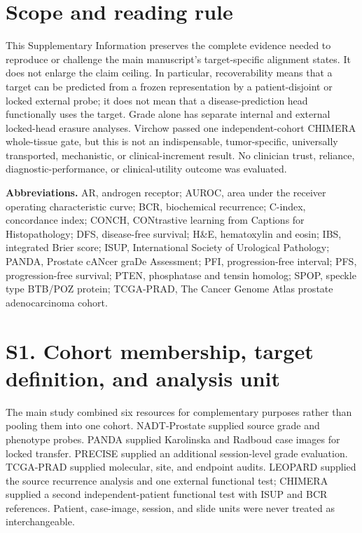 \section*{Scope and reading rule}

This Supplementary Information preserves the complete evidence needed to reproduce or
challenge the main manuscript's target-specific alignment states. It does not enlarge the
claim ceiling. In particular, recoverability means that a target can be predicted from a
frozen representation by a patient-disjoint or locked external probe; it does not mean that
a disease-prediction head functionally uses the target. Grade alone has separate internal and
external locked-head erasure analyses. Virchow passed one independent-cohort CHIMERA
whole-tissue gate, but this is not an indispensable, tumor-specific, universally transported,
mechanistic, or clinical-increment result. No clinician trust, reliance, diagnostic-performance, or
clinical-utility outcome was evaluated.

\noindent\textbf{Abbreviations.} AR, androgen receptor; AUROC, area under the receiver
operating characteristic curve; BCR, biochemical recurrence; C-index, concordance index;
CONCH, CONtrastive learning
from Captions for Histopathology; DFS, disease-free survival; H\&E, hematoxylin and eosin;
IBS, integrated Brier score; ISUP, International Society of Urological Pathology; PANDA,
Prostate cANcer graDe Assessment; PFI, progression-free interval; PFS, progression-free
survival; PTEN, phosphatase and tensin homolog; SPOP, speckle type BTB/POZ protein;
TCGA-PRAD, The Cancer Genome Atlas prostate adenocarcinoma cohort.

\section*{S1. Cohort membership, target definition, and analysis unit}

The main study combined six resources for complementary purposes rather than pooling them
into one cohort. NADT-Prostate supplied source grade and phenotype probes. PANDA supplied
Karolinska and Radboud case images for locked transfer. PRECISE supplied an additional
session-level grade evaluation. TCGA-PRAD supplied molecular, site, and endpoint audits.
LEOPARD supplied the source recurrence analysis and one external functional test; CHIMERA
supplied a second independent-patient functional test with ISUP and BCR references. Patient,
case-image, session, and slide units were never treated as interchangeable.

